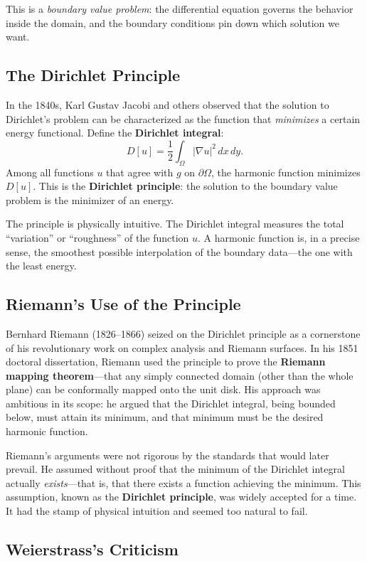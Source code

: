 This is a \emph{boundary value problem}: the differential equation governs the behavior inside the domain, and the boundary conditions pin down which solution we want.

\subsection{The Dirichlet Principle}

In the 1840s, Karl Gustav Jacobi and others observed that the solution to Dirichlet's problem can be characterized as the function that \emph{minimizes} a certain energy functional. Define the \textbf{Dirichlet integral}:
\[
    D[u] = \frac{1}{2} \int_\Omega |\nabla u|^2 \, dx\,dy.
\]
Among all functions $u$ that agree with $g$ on $\partial\Omega$, the harmonic function minimizes $D[u]$. This is the \textbf{Dirichlet principle}: the solution to the boundary value problem is the minimizer of an energy.

The principle is physically intuitive. The Dirichlet integral measures the total ``variation'' or ``roughness'' of the function $u$. A harmonic function is, in a precise sense, the smoothest possible interpolation of the boundary data---the one with the least energy.

\subsection{Riemann's Use of the Principle}

Bernhard Riemann (1826--1866) seized on the Dirichlet principle as a cornerstone of his revolutionary work on complex analysis and Riemann surfaces. In his 1851 doctoral dissertation, Riemann used the principle to prove the \textbf{Riemann mapping theorem}---that any simply connected domain (other than the whole plane) can be conformally mapped onto the unit disk. His approach was ambitious in its scope: he argued that the Dirichlet integral, being bounded below, must attain its minimum, and that minimum must be the desired harmonic function.

Riemann's arguments were not rigorous by the standards that would later prevail. He assumed without proof that the minimum of the Dirichlet integral actually \emph{exists}---that is, that there exists a function achieving the minimum. This assumption, known as the \textbf{Dirichlet principle}, was widely accepted for a time. It had the stamp of physical intuition and seemed too natural to fail.

\subsection{Weierstrass's Criticism}

